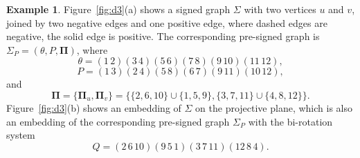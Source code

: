 \documentclass[12pt]{article}
\theoremstyle{definition}
\newtheorem{example}[theorem]{Example}
\begin{document}
\begin{example}
Figure~\ref{fig:d3}(a) shows a signed graph $\Sigma$ with two vertices $u$ and $v$, joined by two negative edges and one positive edge, where
dashed edges are negative, the solid edge is positive. The corresponding pre-signed graph is $\Sigma_P=(\theta,P,\mathbf{\Pi})$, where
$$\theta=(1\,2)(3\,4)(5\,6)(7\,8)(9\,10)(11\,12),$$
$$P=(1\,3)(2\,4)(5\,8)(6\,7)(9\,11)(10\,12),$$
and
$$\mathbf{\Pi} = \{ \mathbf{\Pi}_u,\mathbf{\Pi}_v\}=\bigl\{ \{2,6,10\}\cup\{1,5,9\}, \{3,7,11\}\cup\{4,8,12\} \bigr\}.$$
Figure~\ref{fig:d3}(b) shows an embedding of $\Sigma$ on the projective plane, which is also an embedding of the corresponding pre-signed graph $\Sigma_P$ with the bi-rotation system
$$Q=(2\,6\,10)(9\,5\,1)(3\,7\,11)(12\,8\,4).
$$\end{example}
\end{document}
